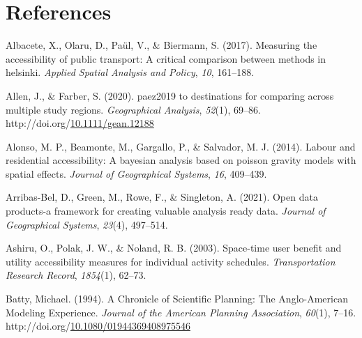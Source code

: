 \documentclass[
11pt, %
oneside, %
english, %
singlespacing, %
]{macthesis} %
\newlength{\cslhangindent}
\newenvironment{CSLReferences}[2] %
{\begin{list}{}{%
	\setlength{\itemindent}{0pt}
	\setlength{\leftmargin}{0pt}
	\setlength{\parsep}{0pt}
	\ifodd #1
	\setlength{\leftmargin}{\cslhangindent}
	\setlength{\itemindent}{-1\cslhangindent}
	\fi
	\setlength{\itemsep}{#2\baselineskip}}}
{\end{list}}
\begin{document}
\backmatter

\chapter*{References}\label{references}


\noindent

\setlength{\parindent}{-0.20in}
\setlength{\leftskip}{0.20in}
\setlength{\parskip}{8pt}

\label{refs}
\begin{CSLReferences}{1}{0}
Albacete, X., Olaru, D., Paül, V., \& Biermann, S. (2017). Measuring the accessibility of public transport: A critical comparison between methods in helsinki. \emph{Applied Spatial Analysis and Policy}, \emph{10}, 161--188.

Allen, J., \& Farber, S. (2020). paez2019 to destinations for comparing across multiple study regions. \emph{Geographical Analysis}, \emph{52}(1), 69--86. http://doi.org/\href{https://doi.org/10.1111/gean.12188}{10.1111/gean.12188}

Alonso, M. P., Beamonte, M., Gargallo, P., \& Salvador, M. J. (2014). Labour and residential accessibility: A bayesian analysis based on poisson gravity models with spatial effects. \emph{Journal of Geographical Systems}, \emph{16}, 409--439.

Arribas-Bel, D., Green, M., Rowe, F., \& Singleton, A. (2021). Open data products-a framework for creating valuable analysis ready data. \emph{Journal of Geographical Systems}, \emph{23}(4), 497--514.

Ashiru, O., Polak, J. W., \& Noland, R. B. (2003). Space-time user benefit and utility accessibility measures for individual activity schedules. \emph{Transportation Research Record}, \emph{1854}(1), 62--73.

Batty, Michael. (1994). A {Chronicle} of {Scientific} {Planning}: {The} {Anglo}-{American} {Modeling} {Experience}. \emph{Journal of the American Planning Association}, \emph{60}(1), 7--16. http://doi.org/\href{https://doi.org/10.1080/01944369408975546}{10.1080/01944369408975546}


\end{CSLReferences}
\end{document}
